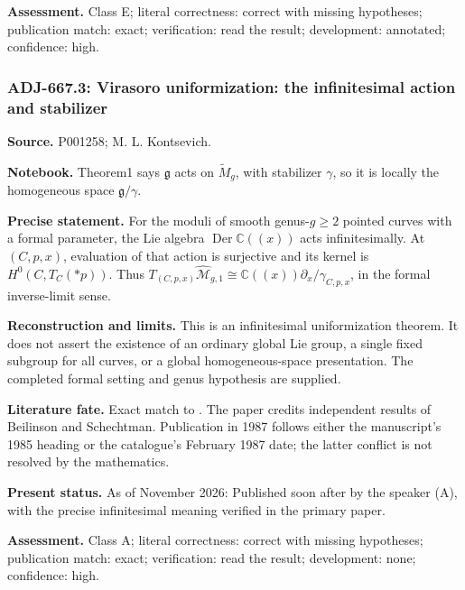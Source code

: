 \noindent\textbf{Assessment.} Class E; literal correctness: correct with missing hypotheses; publication match: exact; verification: read the result; development: annotated; confidence: high.\par

\subsubsection{ADJ-667.3: Virasoro uniformization: the infinitesimal action and stabilizer}
\noindent\textbf{Source.} P001258; M. L. Kontsevich.\par
\noindent\textbf{Notebook.} Theorem1 says \(\mathfrak g\) acts on \(\widetilde M_g\), with stabilizer \(\gamma\), so it is locally the homogeneous space \(\mathfrak g/\gamma\).\par

\noindent\textbf{Precise statement.} For the moduli of smooth genus-\(g\ge2\) pointed curves with a formal parameter, the Lie algebra \(\operatorname{Der}\mathbb C((x))\) acts infinitesimally. At \((C,p,x)\), evaluation of that action is surjective and its kernel is \(H^0(C,T_C(*p))\). Thus \(T_{(C,p,x)}\widehat{\mathcal M}_{g,1}\cong\mathbb C((x))\partial_x/\gamma_{C,p,x}\), in the formal inverse-limit sense.\par

\noindent\textbf{Reconstruction and limits.} This is an infinitesimal uniformization theorem. It does not assert the existence of an ordinary global Lie group, a single fixed subgroup for all curves, or a global homogeneous-space presentation. The completed formal setting and genus hypothesis are supplied.\par

\noindent\textbf{Literature fate.} Exact match to \citet[\S1, proposition and preceding tangent formula]{kontsevich1987virasoro}. The paper credits independent results of Beilinson and Schechtman. Publication in 1987 follows either the manuscript's 1985 heading or the catalogue's February 1987 date; the latter conflict is not resolved by the mathematics.\par

\noindent\textbf{Present status.} As of November 2026: Published soon after by the speaker (A), with the precise infinitesimal meaning verified in the primary paper.\par

\noindent\textbf{Assessment.} Class A; literal correctness: correct with missing hypotheses; publication match: exact; verification: read the result; development: none; confidence: high.\par

